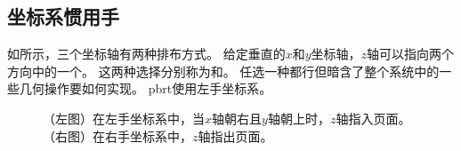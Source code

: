 \subsection{坐标系惯用手}\label{sub:坐标系惯用手}
如所示，三个坐标轴有两种排布方式。
给定垂直的$x$和$y$坐标轴，$z$轴可以指向两个方向中的一个。
这两种选择分别称为和。
任选一种都行但暗含了整个系统中的一些几何操作要如何实现。
pbrt使用左手坐标系。
\begin{figure}[htbp]
    \centering
    \caption{（左图）在左手坐标系中，当$x$轴朝右且$y$轴朝上时，$z$轴指入页面。
        （右图）在右手坐标系中，$z$轴指出页面。}
    \label{fig:2.2}
\end{figure}